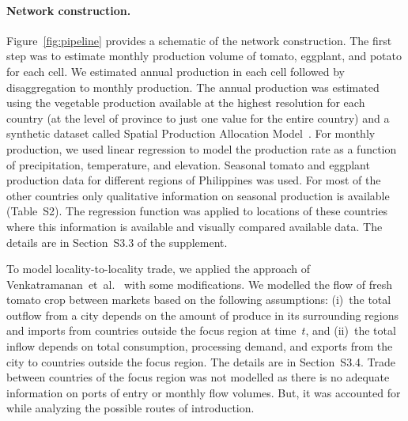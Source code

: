\documentclass[11pt]{article}
\theoremstyle{definition}
\begin{document}
\paragraph{Network construction.} 
Figure~\ref{fig:pipeline} provides a schematic of the network construction.
The first step was to estimate monthly production volume of tomato,
eggplant, and potato for each cell. We estimated annual production in each
cell followed by disaggregation to monthly production. The annual
production was estimated using the vegetable production available at the
highest resolution for each country (at the level of province to just one
value for the entire country) and a synthetic dataset called Spatial
Production Allocation Model~\cite{spam}. For monthly production, we
used linear regression to model the production rate as a function of
precipitation, temperature, and elevation. Seasonal tomato and eggplant
production data for different regions of Philippines was used. For most of
the other countries only qualitative information on seasonal production
is available (Table~S2). The regression function was
applied to locations of these countries where this information is
available and visually compared available data. The details are in
Section~S3.3 of the supplement.

To model locality-to-locality trade, we applied the approach of
Venkatramanan~et~al.~\cite{venkatramanan2019modeling}
with some modifications. We modelled the flow of fresh tomato crop between
markets based on the following assumptions: (i)~the total outflow from a
city depends on the amount of produce in its surrounding regions and
imports from countries outside the focus region at time~$t$, and (ii)~the
total inflow depends on total consumption, processing demand, and exports
from the city to countries outside the focus region. The details are in
Section~S3.4. Trade between countries of the focus region
was not modelled as there is no adequate information on ports of entry or
monthly flow volumes. But, it was accounted for while analyzing the
possible routes of introduction.
\end{document}
